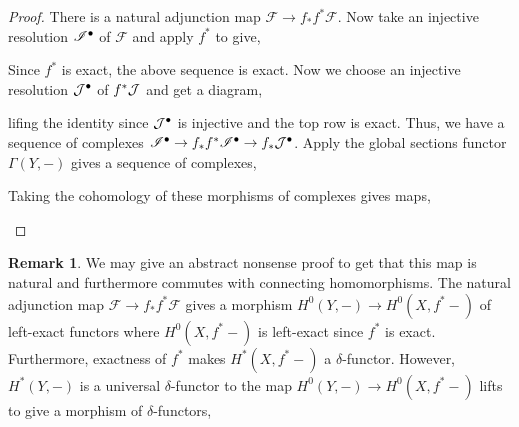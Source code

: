 \documentclass[12pt]{extarticle}
\theoremstyle{definition}
\newtheorem{remark}{Remark}
\newcommand{\F}{\mathcal{F}}
\begin{document}
\begin{proof}
There is a natural adjunction map $\F \to f_* f^* \F$. Now take an injective resolution $\mathscr{I}^\bullet$ of $\F$ and apply $f^*$ to give,
\begin{center}
\end{center}
Since $f^*$ is exact, the above sequence is exact. Now we choose an injective resolution $\mathcal{J}^\bullet$ of $f^* \mathcal{J}$ and get a diagram,
\begin{center}
\end{center}
lifing the identity since $\mathcal{J}^\bullet$ is injective and the top row is exact. Thus, we have a sequence of complexes $\mathscr{I}^\bullet \to f_* f^* \mathscr{I}^\bullet \to f_* \mathcal{J}^\bullet$. Apply the global sections functor $\Gamma(Y, -)$ gives a sequence of complexes,
\begin{center}
\end{center}
Taking the cohomology of these morphisms of complexes gives maps,
\begin{center}
\end{center}
\end{proof}

\begin{remark}
We may give an abstract nonsense proof to get that this map is natural and furthermore commutes with connecting homomorphisms. The natural adjunction map $\F \to f_* f^* \F$ gives a morphism $H^0(Y, -) \to H^0(X, f^* -)$ of left-exact functors where $H^0(X, f^* -)$ is left-exact since $f^*$ is exact. Furthermore, exactness of $f^*$ makes $H^*(X, f^* - )$ a $\delta$-functor. However, $H^*(Y, -)$ is a universal $\delta$-functor to the map $H^0(Y, -) \to H^0(X, f^* - )$ lifts to give a morphism of $\delta$-functors,  \begin{center}
\end{center} 
\end{remark}
\end{document}
